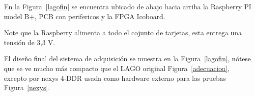 En la Figura~\ref{lagofin} se encuentra ubicado de abajo hacia arriba la Raspberry PI model B+, PCB con perifericos y la FPGA Icoboard.

Note que la Raspberry alimenta a todo el cojunto de tarjetas, esta entrega una tensión de 3,3 V.


El diseño final del sistema de adquisición se muestra en la Figura~\ref{lagofin}, nótese que se ve mucho más compacto  que el LAGO original Figura~\ref{adecuacion}, excepto por nexys 4-DDR usada como hardware externo para las pruebas Figura~\ref{nexys}.


